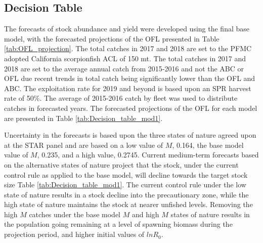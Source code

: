 \documentclass[12pt,]{article}
\begin{document}
\FloatBarrier

\subsection*{Decision Table}\label{decision-table}

The forecasts of stock abundance and yield were developed using the
final base model, with the forecasted projections of the OFL presented
in Table \ref{tab:OFL_projection}. The total catches in 2017 and 2018
are set to the PFMC adopted California scorpionfish ACL of 150 mt. The
total catches in 2017 and 2018 are set to the average annual catch from
2015-2016 and not the ABC or OFL due recent trends in total catch being
significantly lower than the OFL and ABC. The exploitation rate for 2019
and beyond is based upon an SPR harvest rate of 50\%. The average of
2015-2016 catch by fleet was used to distribute catches in forecasted
years. The forecasted projections of the OFL for each model are
presented in Table \ref{tab:Decision_table_mod1}.

Uncertainty in the forecasts is based upon the three states of nature
agreed upon at the STAR panel and are based on a low value of \(M\),
0.164, the base model value of \(M\), 0.235, and a high value, 0.2745.
Current medium-term forecasts based on the alternative states of nature
project that the stock, under the current control rule as applied to the
base model, will decline towards the target stock size Table
\ref{tab:Decision_table_mod1}. The current control rule under the low
state of nature results in a stock decline into the precautionary zone,
while the high state of nature maintains the stock at nearer unfished
levels. Removing the high \(M\) catches under the base model \(M\) and
high \(M\) states of nature results in the population going remaining at
a level of spawning biomass during the projection period, and higher
initial values of \(lnR_0\).
\end{document}
